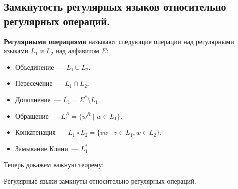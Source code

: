 \documentclass[a4paper,12pt]{article}
\begin{document}
	\subsection{Замкнутость регулярных языков относительно регулярных операций. }
	\textbf{Регулярными операциями} называют следующие операции над регулярными языками $L_1$ и $L_2$ над алфавитом $\Sigma$:
	\begin{itemize}
		\item Объединение~--- $L_1 \cup L_2$.
		\item Пересечение~--- $L_1 \cap L_2$.
		\item Дополнение~--- $\overline{L_1} = \Sigma^* \setminus L_1$.
		\item Обращение~--- $L_1^R = \{w^R \mid w \in L_1\}$.
		\item Конкатенация~--- $L_1 \circ L_2 = \{vw \mid v \in L_1, w \in L_2\}$.
		\item Замыкание Клини~--- $L_1^*$
	\end{itemize}
	Теперь докажем важную теорему:
	\begin{theorem}
		Регулярные языки замкнуты относительно регулярных операций.
	\end{theorem}
\end{document}
